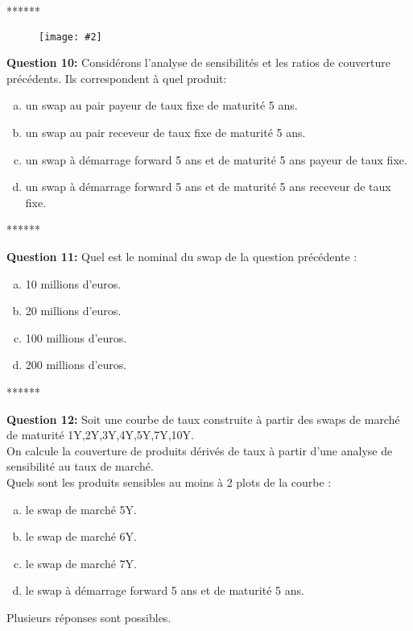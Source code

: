 \documentclass{article}
\newcommand{\FIG}[2]{\texttt{[image: \#2]}}
\newcommand{\indentitem}{\setlength\itemindent{25pt}}
\begin{document}
\newpage
\smallskip
\centerline{******}
\smallskip
\begin{figure}[H]
\FIG{15cm}{figures/hedgeratio3.png}
\end{figure}
\textbf{Question 10:}
Considérons l'analyse de sensibilités et les ratios de couverture précédents. Ils correspondent à quel produit:
\begin{enumerate}[a)]
\indentitem \item un swap au pair payeur de taux fixe de maturité 5 ans.
\indentitem \item un swap au pair receveur de taux fixe de maturité 5 ans.
\indentitem \item un swap à démarrage forward 5 ans et de maturité 5 ans payeur de taux fixe.
\indentitem \item un swap à démarrage forward 5 ans et de maturité 5 ans receveur de taux fixe.
\end{enumerate}
\smallskip
\centerline{******}
\smallskip
\textbf{Question 11:}
Quel est le nominal du swap de la question précédente :
\begin{enumerate}[a)]
\indentitem \item 10 millions d’euros.
\indentitem \item 20 millions d’euros.
\indentitem \item 100 millions d’euros.
\indentitem \item 200 millions d’euros.
\end{enumerate}
\newpage
\smallskip
\centerline{******}
\smallskip
\textbf{Question 12:}
Soit une courbe de taux construite à partir des swaps de marché de maturité 1Y,2Y,3Y,4Y,5Y,7Y,10Y.\\
On calcule la couverture de produits dérivés de taux à partir d’une analyse de sensibilité au taux de marché.\\
Quels sont les produits sensibles au moins à 2 plots de la courbe :
\begin{enumerate}[a)]
\indentitem \item le swap de marché 5Y.
\indentitem \item le swap de marché 6Y.
\indentitem \item le swap de marché 7Y.
\indentitem \item le swap à démarrage forward 5 ans et de maturité 5 ans.
\end{enumerate}
Plusieurs réponses sont possibles.
\end{document}
